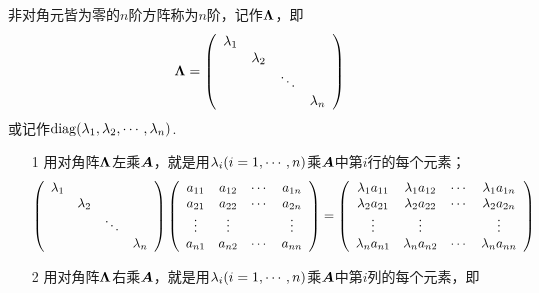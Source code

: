 \begin{frame}

\begin{dingyi}[对角矩阵]
  非对角元皆为零的$n$阶方阵称为$n$阶，记作$\boldsymbol{\Lambda}$，即
  $$
  \boldsymbol{\Lambda} = \left(
    \begin{array}{cccc}
      \lambda_1 & & &\\
                & \lambda_2 & & \\
                & & \ddots & \\
                & & & \lambda_n
    \end{array}
  \right)
  $$
  或记作$\mathrm{diag}(\lambda_1,\lambda_2,\cdots,\lambda_n)$.
\end{dingyi}
\end{frame}

\begin{frame}
\begin{zhu}
  \begin{itemize}
  \item[1] 用对角阵$\boldsymbol{\Lambda}$左乘$\boldsymbol{A}$，就是用$\lambda_i(i=1,\cdots,n)$乘$\boldsymbol{A}$中第$i$行的每个元素；
    $$
    \left(
      \begin{array}{cccc}
        \lambda_1 & & &\\
                  & \lambda_2 & & \\
                  & & \ddots & \\
                  & & & \lambda_n
      \end{array}
    \right)
    \left(
      \begin{array}{cccc}
        a_{11} & a_{12} & \cdots & a_{1n}\\
        a_{21} & a_{22} & \cdots & a_{2n}\\
        \vdots & \vdots &  & \vdots\\
        a_{n1} & a_{n2} & \cdots & a_{nn}
      \end{array}
    \right) = 
    \left(
      \begin{array}{cccc}
        \lambda_1 a_{11} & \lambda_1a_{12} & \cdots & \lambda_1a_{1n}\\
        \lambda_2a_{21} & \lambda_2a_{22} & \cdots & \lambda_2a_{2n}\\
        \vdots & \vdots &  & \vdots\\
        \lambda_na_{n1} & \lambda_na_{n2} & \cdots & \lambda_na_{nn}
      \end{array}
    \right)
    $$         \pause 
  \item[2] 用对角阵$\boldsymbol{\Lambda}$右乘$\boldsymbol{A}$，就是用$\lambda_i(i=1,\cdots,n)$乘$\boldsymbol{A}$中第$i$列的每个元素，即

\end{itemize}
\end{zhu}
\end{frame}
